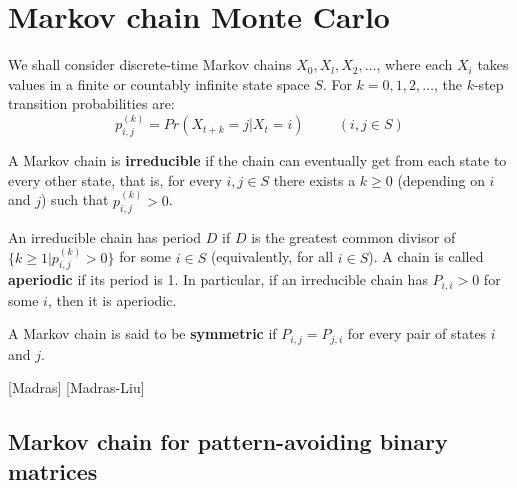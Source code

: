 \chapter{Markov chain Monte Carlo}
We shall consider discrete-time Markov chains $X_0,X_l,X_2,\dots$, where each $X_i$ takes values in a finite or countably infinite state space $S$. For $k=0,1,2,\dots$, the $k$-step transition probabilities are:
$$p_{i,j}^{(k)}=Pr(X_{t+k}=j|X_t=i) \hspace{1cm} (i,j\in S)$$

A Markov chain is \textbf{irreducible} if the chain can eventually get from each state to every other state, that is, for every $i,j\in S$ there exists a $k\geq0$ (depending on $i$ and $j$) such that $p_{i,j}^{(k)}>0$.

An irreducible chain has period $D$ if $D$ is the greatest common divisor of $\{k\geq1|p_{i,j}^{(k)}>0\}$ for some $i\in S$ (equivalently, for all $i\in S$). A chain is called \textbf{aperiodic} if its period is 1. In particular, if an irreducible chain has $P_{i,i}>0$ for some $i$, then it is aperiodic.

A Markov chain is said to be \textbf{symmetric} if $P_{i,j}=P_{j,i}$ for every pair of states $i$ and $j$.

[Madras]
[Madras-Liu]

\section{Markov chain for pattern-avoiding binary matrices}
